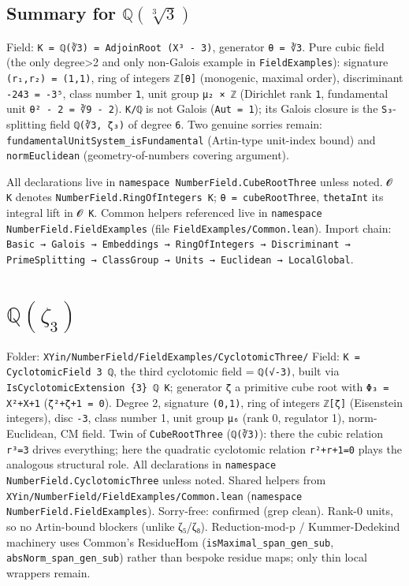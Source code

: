 \documentclass[UTF8,a4paper,11pt,fontset=fandol]{ctexart}
\theoremstyle{definition}
\begin{document}
\subsection{Summary for \(\mathbb Q(\sqrt[3]{3})\)}

Field: \texttt{K = ℚ(∛3) = AdjoinRoot (X³ - 3)}, generator \texttt{θ = ∛3}. Pure cubic field (the only degree>2 and only non-Galois example in \texttt{FieldExamples}): signature \texttt{(r₁,r₂) = (1,1)}, ring of integers \texttt{ℤ[θ]} (monogenic, maximal order), discriminant \texttt{-243 = -3⁵}, class number \texttt{1}, unit group \texttt{μ₂ × ℤ} (Dirichlet rank \texttt{1}, fundamental unit \texttt{θ² - 2 = ∛9 - 2}). \texttt{K/\allowbreak{}ℚ} is not Galois (\texttt{Aut = 1}); its Galois closure is the \texttt{S₃}-splitting field \texttt{ℚ(∛3, ζ₃)} of degree \texttt{6}. Two genuine sorries remain: \texttt{fundamentalUnitSystem\_\allowbreak{}isFundamental} (Artin-type unit-index bound) and \texttt{normEuclidean} (geometry-of-numbers covering argument).

All declarations live in \texttt{namespace NumberField.\allowbreak{}CubeRootThree} unless noted. \texttt{𝓞 K} denotes \texttt{NumberField.\allowbreak{}RingOfIntegers K}; \texttt{θ = cubeRootThree}, \texttt{thetaInt} its integral lift in \texttt{𝓞 K}. Common helpers referenced live in \texttt{namespace NumberField.\allowbreak{}FieldExamples} (file \texttt{FieldExamples/\allowbreak{}Common.\allowbreak{}lean}). Import chain: \texttt{Basic → Galois → Embeddings → RingOfIntegers → Discriminant → PrimeSplitting → ClassGroup → Units → Euclidean → LocalGlobal}.


\section{\(\mathbb Q(\zeta_3)\)}

Folder: \texttt{XYin/\allowbreak{}NumberField/\allowbreak{}FieldExamples/\allowbreak{}CyclotomicThree/\allowbreak{}} Field: \texttt{K = CyclotomicField 3 ℚ}, the third cyclotomic field = \texttt{ℚ(√-3)}, built via \texttt{IsCyclotomicExtension \{3\} ℚ K}; generator \texttt{ζ} a primitive cube root with \texttt{Φ₃ = X²+X+1} (\texttt{ζ²+ζ+1 = 0}). Degree 2, signature \texttt{(0,1)}, ring of integers \texttt{ℤ[ζ]} (Eisenstein integers), disc \texttt{-3}, class number 1, unit group \texttt{μ₆} (rank 0, regulator 1), norm-Euclidean, CM field. Twin of \texttt{CubeRootThree} (\texttt{ℚ(∛3)}): there the cubic relation \texttt{r³=3} drives everything; here the quadratic cyclotomic relation \texttt{r²+r+1=0} plays the analogous structural role. All declarations in \texttt{namespace NumberField.\allowbreak{}CyclotomicThree} unless noted. Shared helpers from \texttt{XYin/\allowbreak{}NumberField/\allowbreak{}FieldExamples/\allowbreak{}Common.\allowbreak{}lean} (\texttt{namespace NumberField.\allowbreak{}FieldExamples}). Sorry-free: confirmed (grep clean). Rank-0 units, so no Artin-bound blockers (unlike ζ₅/ζ₈). Reduction-mod-p / Kummer-Dedekind machinery uses Common's ResidueHom (\texttt{isMaximal\_\allowbreak{}span\_\allowbreak{}gen\_\allowbreak{}sub}, \texttt{absNorm\_\allowbreak{}span\_\allowbreak{}gen\_\allowbreak{}sub}) rather than bespoke residue maps; only thin local wrappers remain.
\end{document}
